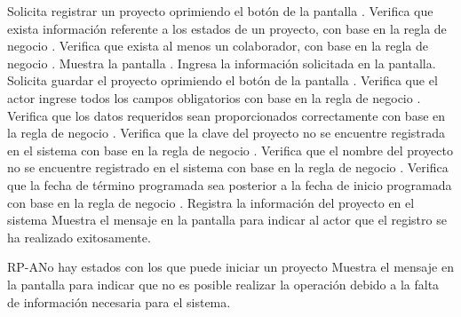 	\begin{UCtrayectoria}
		\UCpaso[\UCactor] Solicita registrar un proyecto oprimiendo el botón  de la pantalla .
		\UCpaso[\UCsist] Verifica que exista información referente a los estados de un proyecto, con base en la regla de negocio . 
		\UCpaso[\UCsist] Verifica que exista al menos un colaborador, con base en la regla de negocio . 
		\UCpaso[\UCsist] Muestra la pantalla .
		\UCpaso[\UCactor] Ingresa la información solicitada en la pantalla. \label{CU2.1-P5}
		\UCpaso[\UCactor] Solicita guardar el proyecto oprimiendo el botón  de la pantalla . 
		\UCpaso[\UCsist] Verifica que el actor ingrese todos los campos obligatorios con base en la regla de negocio . 
		\UCpaso[\UCsist] Verifica que los datos requeridos sean proporcionados correctamente con base en la regla de negocio .  
		\UCpaso[\UCsist] Verifica que la clave del proyecto no se encuentre registrada en el sistema con base en la regla de negocio . 
		\UCpaso[\UCsist] Verifica que el nombre del proyecto no se encuentre registrado en el sistema con base en la regla de negocio . 
		\UCpaso[\UCsist] Verifica que la fecha de término programada sea posterior a la fecha de inicio programada con base en la regla de negocio . 
		\UCpaso[\UCsist] Registra la información del proyecto en el sistema
		\UCpaso[\UCsist] Muestra el mensaje  en la pantalla  para indicar al actor que el registro se ha realizado exitosamente.
	\end{UCtrayectoria}		
		\begin{UCtrayectoriaA}{RP-A}{No hay estados con los que puede iniciar un proyecto}
			\UCpaso[\UCsist] Muestra el mensaje  en la pantalla  para indicar que no es posible realizar la operación debido a la falta de información necesaria para el sistema.
		\end{UCtrayectoriaA}


